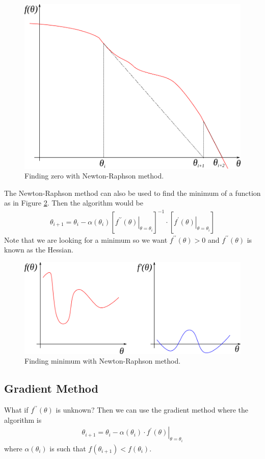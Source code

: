 \begin{figure}[ht!]
	\centering
	\includegraphics[width=.4\textwidth]{images/18nr}
	\caption{Finding zero with Newton-Raphson method.}
	\label{fig:18nr}
\end{figure}

The Newton-Raphson method can also be used to find the minimum of a function as in Figure \ref{fig:18min}. Then the algorithm would be
\begin{align*}
\boxed{\theta_{i+1} = \theta_i - \alpha(\theta_i)\left[\left.f^{\prime\prime}(\theta)\right|_{\theta=\theta_i}\right]^{-1}\cdot\left[\left.f^\prime(\theta)\right|_{\theta=\theta_i}\right]}
\end{align*}
Note that we are looking for a minimum so we want $f^{\prime\prime}(\theta)>0$ and $f^{\prime\prime}(\theta)$ is known as the Hessian.

\begin{figure}[ht!]
	\centering
	\includegraphics[width=.6\textwidth]{images/18min}
	\caption{Finding minimum with Newton-Raphson method.}
	\label{fig:18min}
\end{figure}

\subsection{Gradient Method}
What if $f^{\prime\prime}(\theta)$ is unknown? Then we can use the gradient method where the algorithm is
\begin{align*}
\boxed{\theta_{i+1} = \theta_i - \alpha(\theta_i)\cdot \left.f^\prime(\theta)\right|_{\theta=\theta_i}}
\end{align*}
where $\alpha(\theta_i)$ is such that $f(\theta_{i+1})<f(\theta_i)$.

